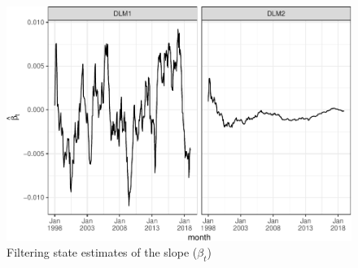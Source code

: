 \documentclass[12pt, a4paper]{article}
\begin{document}
\begin{figure}[H]
  \caption{\label{fig:trend-growth}Filtering state estimates of the slope
($\beta_t$)}
\centering
\includegraphics[scale = 0.8]{../figs/freq--trend-growth-1.pdf}
\end{figure}
\end{document}
